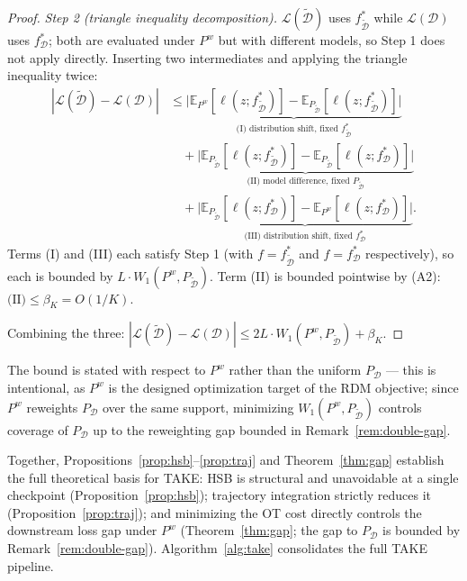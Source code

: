\documentclass[12pt, a4paper, twoside]{book}
\numberwithin{equation}{chapter}
\theoremstyle{plain}
\theoremstyle{definition}
\theoremstyle{remark}
\newenvironment{foldable}{}{}
\begin{document}
\begin{foldable}
\begin{proof}
    \textit{Step 2 (triangle inequality decomposition).}
    $\mathcal{L}(\tilde{\mathcal{D}})$ uses $f^*_{\tilde{\mathcal{D}}}$ while $\mathcal{L}(\mathcal{D})$ uses $f^*_\mathcal{D}$; both are evaluated under $P^w$ but with different models, so Step 1 does not apply directly.
    Inserting two intermediates and applying the triangle inequality twice:
    \begin{align*}
      |\mathcal{L}(\tilde{\mathcal{D}}) - \mathcal{L}(\mathcal{D})|
      &\leq \underbrace{\bigl|\mathbb{E}_{P^w}[\ell(z;f^*_{\tilde{\mathcal{D}}})] - \mathbb{E}_{P_{\tilde{\mathcal{D}}}}[\ell(z;f^*_{\tilde{\mathcal{D}}})]\bigr|}_{\text{(I) distribution shift, fixed }f^*_{\tilde{\mathcal{D}}}} \\
      &\quad + \underbrace{\bigl|\mathbb{E}_{P_{\tilde{\mathcal{D}}}}[\ell(z;f^*_{\tilde{\mathcal{D}}})] - \mathbb{E}_{P_{\tilde{\mathcal{D}}}}[\ell(z;f^*_\mathcal{D})]\bigr|}_{\text{(II) model difference, fixed }P_{\tilde{\mathcal{D}}}} \\
      &\quad + \underbrace{\bigl|\mathbb{E}_{P_{\tilde{\mathcal{D}}}}[\ell(z;f^*_\mathcal{D})] - \mathbb{E}_{P^w}[\ell(z;f^*_\mathcal{D})]\bigr|}_{\text{(III) distribution shift, fixed }f^*_\mathcal{D}}.
    \end{align*}
    Terms (I) and (III) each satisfy Step 1 (with $f = f^*_{\tilde{\mathcal{D}}}$ and $f = f^*_\mathcal{D}$ respectively), so each is bounded by $L \cdot W_1(P^w, P_{\tilde{\mathcal{D}}})$.
    Term (II) is bounded pointwise by (A2): $\text{(II)} \leq \beta_K = O(1/K)$.

    Combining the three: $|\mathcal{L}(\tilde{\mathcal{D}}) - \mathcal{L}(\mathcal{D})| \leq 2L \cdot W_1(P^w, P_{\tilde{\mathcal{D}}}) + \beta_K$.
  \end{proof}
  The bound is stated with respect to $P^w$ rather than the uniform $P_\mathcal{D}$ --- this is intentional, as $P^w$ is the designed optimization target of the \ac{RDM} objective; since $P^w$ reweights $P_\mathcal{D}$ over the same support, minimizing $W_1(P^w, P_{\tilde{\mathcal{D}}})$ controls coverage of $P_\mathcal{D}$ up to the reweighting gap bounded in Remark~\ref{rem:double-gap}.
\end{foldable}

\begin{foldable} Together, Propositions~\ref{prop:hsb}--\ref{prop:traj} and Theorem~\ref{thm:gap} establish the full theoretical basis for \ac{TAKE}: \ac{HSB} is structural and unavoidable at a single checkpoint (Proposition~\ref{prop:hsb}); trajectory integration strictly reduces it (Proposition~\ref{prop:traj}); and minimizing the \ac{OT} cost directly controls the downstream loss gap under $P^w$ (Theorem~\ref{thm:gap}; the gap to $P_\mathcal{D}$ is bounded by Remark~\ref{rem:double-gap}).
  Algorithm~\ref{alg:take} consolidates the full \ac{TAKE} pipeline.
\end{foldable}
\end{document}
